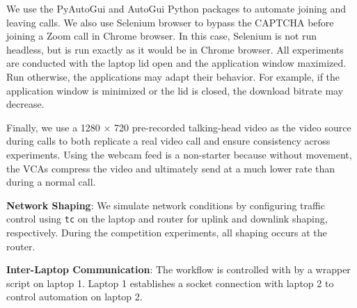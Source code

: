 We use the PyAutoGui and AutoGui Python packages to automate joining and leaving calls. We also use Selenium browser to bypass the CAPTCHA before joining a Zoom call in Chrome browser. In this case, Selenium is not run headless, but is run exactly as it would be in Chrome browser. All experiments are conducted with the laptop lid open and the application window maximized. Run otherwise, the applications may adapt their behavior. For example, if the application window is minimized or the lid is closed, the download bitrate may decrease.

Finally, we use a 1280 $\times$ 720 pre-recorded talking-head video as the video source during calls to both replicate a real video call and ensure consistency across experiments. Using the webcam feed is a non-starter because without movement, the VCAs compress the video and ultimately send at a much lower rate than during a normal call. 

\textbf{Network Shaping}: We simulate network conditions by configuring traffic control using \texttt{tc} on the laptop and router for uplink and downlink shaping, respectively. During the competition experiments, all shaping occurs at the router.

\textbf{Inter-Laptop Communication}: The workflow is controlled with by a wrapper script on laptop 1. Laptop 1 establishes a socket connection with laptop 2 to control automation on laptop 2.
